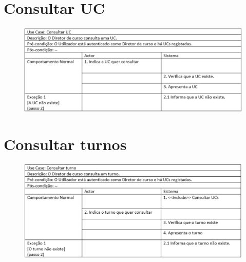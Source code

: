 \documentclass[12pt,a4paper]{report}
\begin{document}
\begin{appendices}
\section{Consultar UC}
\begin{figure}[H]
	\centering 
	\includegraphics[width=\textwidth]{modelacao/especificacao_use_case/admconsultaUCs.png}  
\end{figure}

\section{Consultar turnos}
\begin{figure}[H]
	\centering 
	\includegraphics[width=\textwidth]{modelacao/especificacao_use_case/consultarturno.png}  
\end{figure}


\end{appendices}
\end{document}
